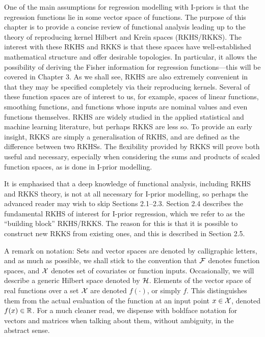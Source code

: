 \documentclass[a4paper,showframe,11pt]{report}
\begin{document}
\label{chapter2}

One of the main assumptions for regression modelling with I-priors is that the regression functions lie in some vector space of functions.
The purpose of this chapter is to provide a concise review of functional analysis leading up to the theory of reproducing kernel Hilbert and Kreĭn spaces (RKHS/RKKS).
The interest with these RKHS and RKKS is that these spaces have well-established mathematical structure and offer desirable topologies.
In particular, it allows the possibility of deriving the Fisher information for regression functions---this will be covered in Chapter 3.
As we shall see, RKHS are also extremely convenient in that they may be specified completely via their reproducing kernels.
Several of these function spaces are of interest to us, for example, spaces of linear functions, smoothing functions, and functions whose inputs are nominal values and even functions themselves.
RKHS are widely studied in the applied statistical and machine learning literature, but perhaps RKKS are less so.
To provide an early insight, RKKS are simply a generalisation of RKHS, and are defined as the difference between two RKHSs.
The flexibility provided by RKKS will prove both useful and necessary, especially when considering the sums and products of scaled function spaces, as is done in I-prior modelling.

It is emphasised that a deep knowledge of functional analysis, including RKHS and RKKS theory, is not at all necessary for I-prior modelling, so perhaps the advanced reader may wish to skip Sections 2.1--2.3. 
Section 2.4 describes the fundamental RKHS of interest for I-prior regression, which we refer to as the ``building block'' RKHS/RKKS.
The reason for this is that it is possible to construct new RKKS from existing ones, and this is described in Section 2.5.

A remark on notation: 
Sets and vector spaces are denoted by calligraphic letters, and as much as possible, we shall stick to the convention that ${\mathcal F}$ denotes function spaces, and ${\mathcal X}$ denotes set of covariates or function inputs. 
Occasionally, we will describe a generic Hilbert space denoted by ${\mathcal H}$.
Elements of the vector space of real functions over a set ${\mathcal X}$ are denoted $f(\cdot)$, or simply $f$.
This distinguishes them from the actual evaluation of the function at an input point $x \in {\mathcal X}$, denoted $f(x) \in \mathbb{R}$.
For a much cleaner read, we dispense with boldface notation for vectors and matrices when talking about them, without ambiguity, in the abstract sense. 
\end{document}
